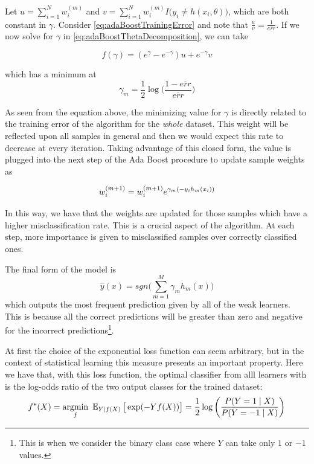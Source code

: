 Let $u = \sum_{i=1}^{N} w_i^{(m)}$ and $v = \sum_{i=1}^{N} w_i^{(m)} I \big( y_i \neq h(x_i,\theta)  \big) $, which are both constant in $\gamma$.
Consider \cref{eq:adaBoostTrainingError} and note that $\frac{u}{v} = \frac{1}{\overline{err}}$.
If we now solve for $\gamma$ in \cref{eq:adaBoostThetaDecomposition}, we can take

\begin{equation}\label{eq:adaBoostBetaMinimization}
f(\gamma) = ( e^{\gamma} - e^{-\gamma}) u + e^{-\gamma}v
\end{equation}

which has a minimum at
\begin{equation}
\gamma_{m} = \frac{1}{2} \log\big( \frac{1 - \overline{err} }{ \overline{err} } \big)
\end{equation}

As seen from the equation above, the minimizing value for $\gamma$ is directly related to the training error of the algorithm for the \textit{whole} dataset.
This weight will be reflected upon all samples in general and then we would expect this rate to decrease at every iteration.
Taking advantage of this closed form, the value is plugged into the next step of the Ada Boost procedure to update sample weights as

\begin{equation}
w_i^{(m+1)} =  w_i^{(m+1)} e^{\gamma_m(-y_i h_m(x_i))} \\
\end{equation}

In this way, we have that the weights are updated for those samples which have a higher misclassification rate.
This is a crucial aspect of the algorithm.
At each step, more importance is given to misclassified samples over correctly classified ones.



The final form of the model is
\begin{equation}
 \hat{y}(x) = sgn\big( \sum_{m=1}^{M} \gamma_m h_m(x) \big)
\end{equation}
  which outputs the most frequent prediction given by all of the weak learners.
  This is because all the correct predictions will be greater than zero and negative for the incorrect predictions\footnote{This is when we consider the binary class case where $Y$ can take only $1$ or $-1$ values.}.

At first the choice of the exponential loss function can seem arbitrary, but in the context of statistical learning this measure presents an important property.
Here we have that, with this loss function, the optimal classifier from alll learners with is the log-odds ratio of the two output classes for the trained dataset:
\begin{equation}
f^*(X) = \underset{f}{\mathrm{argmin}} \ \Expect_{Y | f(X)}\big[ \exp(-Yf(X)) \big] = \frac{1}{2}\log \left( \frac{ P(Y=1 \mid X) }{ P(Y=-1 \mid X) } \right)
\end{equation}


